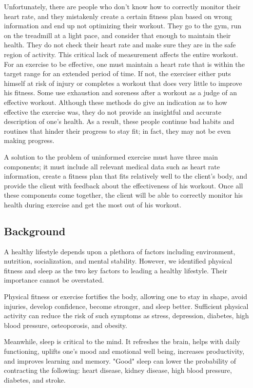 \documentclass[letterpaper,english, 12pt]{scrreprt}
\begin{document}
Unfortunately, there are people who don't know how to correctly monitor their heart rate, and they mistakenly create a certain fitness plan based on wrong information and end up not optimizing their workout. They go to the gym, run on the treadmill at a light pace, and consider that enough to maintain their health. They do not check their heart rate and make sure they are in the safe region of activity. This critical lack of measurement affects the entire workout. For an exercise to be effective, one must maintain a heart rate that is within the target range for an extended period of time. If not, the exerciser either puts himself at risk of injury or completes a workout that does very little to improve his fitness. Some use exhaustion and soreness after a workout as a judge of an effective workout. Although these methods do give an indication as to how effective the exercise was, they do not provide an insightful and accurate description of one's health. As a result, these people continue bad habits and routines that hinder their progress to stay fit; in fact, they may not be even making progress.
 
A solution to the problem of uninformed exercise must have three main components; it must include all relevant medical data such as heart rate information, create a fitness plan that fits relatively well to the client's body, and provide the client with feedback about the effectiveness of his workout. Once all these components come together, the client will be able to correctly monitor his health during exercise and get the most out of his workout.
 
\subsection{Background}
A healthy lifestyle depends upon a plethora of factors including environment, nutrition, socialization, and mental stability. However, we identified physical fitness and sleep as the two key factors to leading a healthy lifestyle. Their importance cannot be overstated.
 
Physical fitness or exercise fortifies the body, allowing one to stay in shape, avoid injuries, develop confidence, become stronger, and sleep better. Sufficient physical activity can reduce the risk of such symptoms as stress, depression, diabetes, high blood pressure, osteoporosis, and obesity.
 
Meanwhile, sleep is critical to the mind. It refreshes the brain, helps with daily functioning, uplifts one's mood and emotional well being, increases productivity, and improves learning and memory. "Good" sleep can lower the probability of contracting the following: heart disease, kidney disease, high blood pressure, diabetes, and stroke.
 
\end{document}
